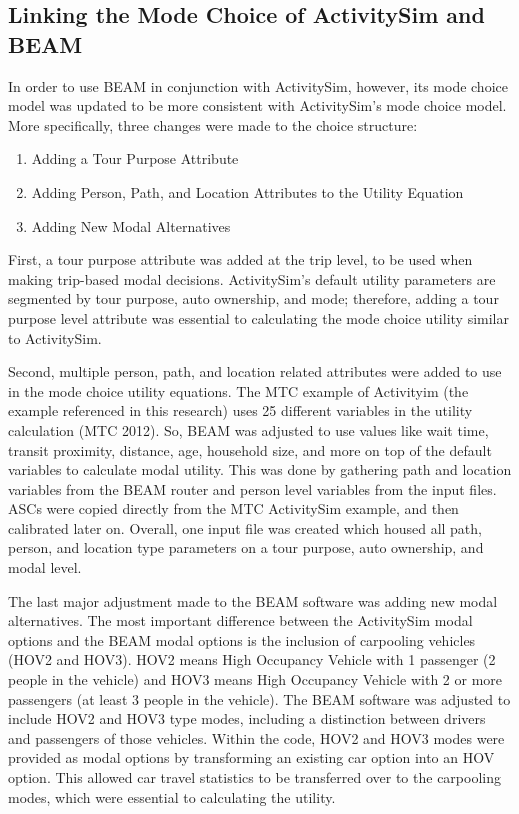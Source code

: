 \documentclass[12pt, oneside, openright]{byuthesis}
\providecommand{\tightlist}{%
  \setlength{\itemsep}{0pt}\setlength{\parskip}{0pt}}
\begin{document}
\hypertarget{linking-the-mode-choice-of-activitysim-and-beam}{%
\subsection{Linking the Mode Choice of ActivitySim and BEAM}\label{linking-the-mode-choice-of-activitysim-and-beam}}

In order to use BEAM in conjunction with ActivitySim, however, its mode choice model was updated to be more consistent with ActivitySim's mode choice model. More specifically, three changes were made to the choice structure:

\begin{enumerate}
\def\labelenumi{\arabic{enumi}.}
\tightlist
\item
  Adding a Tour Purpose Attribute
\item
  Adding Person, Path, and Location Attributes to the Utility Equation
\item
  Adding New Modal Alternatives
\end{enumerate}

First, a tour purpose attribute was added at the trip level, to be used when making trip-based modal decisions. ActivitySim's default utility parameters are segmented by tour purpose, auto ownership, and mode; therefore, adding a tour purpose level attribute was essential to calculating the mode choice utility similar to ActivitySim.

Second, multiple person, path, and location related attributes were added to use in the mode choice utility equations. The MTC example of Activityim (the example referenced in this research) uses 25 different variables in the utility calculation (MTC 2012). So, BEAM was adjusted to use values like wait time, transit proximity, distance, age, household size, and more on top of the default variables to calculate modal utility. This was done by gathering path and location variables from the BEAM router and person level variables from the input files. ASCs were copied directly from the MTC ActivitySim example, and then calibrated later on. Overall, one input file was created which housed all path, person, and location type parameters on a tour purpose, auto ownership, and modal level.

The last major adjustment made to the BEAM software was adding new modal alternatives. The most important difference between the ActivitySim modal options and the BEAM modal options is the inclusion of carpooling vehicles (HOV2 and HOV3). HOV2 means High Occupancy Vehicle with 1 passenger (2 people in the vehicle) and HOV3 means High Occupancy Vehicle with 2 or more passengers (at least 3 people in the vehicle). The BEAM software was adjusted to include HOV2 and HOV3 type modes, including a distinction between drivers and passengers of those vehicles. Within the code, HOV2 and HOV3 modes were provided as modal options by transforming an existing car option into an HOV option. This allowed car travel statistics to be transferred over to the carpooling modes, which were essential to calculating the utility.
\end{document}

